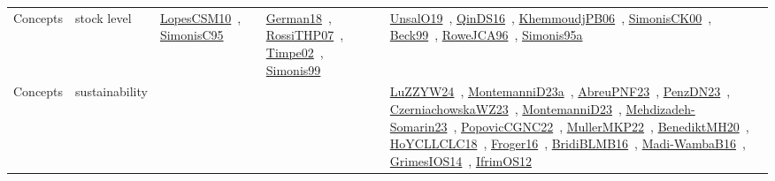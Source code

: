 {\begin{longtable}{lp{3cm}>{\raggedright\arraybackslash}p{6cm}>{\raggedright\arraybackslash}p{6cm}>{\raggedright\arraybackslash}p{8cm}}
Concepts & stock level & \href{../works/LopesCSM10.pdf}{LopesCSM10}~\cite{LopesCSM10}, \href{../works/SimonisC95.pdf}{SimonisC95}~\cite{SimonisC95} & \href{../works/German18.pdf}{German18}~\cite{German18}, \href{../works/RossiTHP07.pdf}{RossiTHP07}~\cite{RossiTHP07}, \href{../works/Timpe02.pdf}{Timpe02}~\cite{Timpe02}, \href{../works/Simonis99.pdf}{Simonis99}~\cite{Simonis99} & \href{../works/UnsalO19.pdf}{UnsalO19}~\cite{UnsalO19}, \href{../works/QinDS16.pdf}{QinDS16}~\cite{QinDS16}, \href{../works/KhemmoudjPB06.pdf}{KhemmoudjPB06}~\cite{KhemmoudjPB06}, \href{../works/SimonisCK00.pdf}{SimonisCK00}~\cite{SimonisCK00}, \href{../works/Beck99.pdf}{Beck99}~\cite{Beck99}, \href{../works/RoweJCA96.pdf}{RoweJCA96}~\cite{RoweJCA96}, \href{../works/Simonis95a.pdf}{Simonis95a}~\cite{Simonis95a}\\
Concepts & sustainability &  &  & \href{../works/LuZZYW24.pdf}{LuZZYW24}~\cite{LuZZYW24}, \href{../works/MontemanniD23a.pdf}{MontemanniD23a}~\cite{MontemanniD23a}, \href{../works/AbreuPNF23.pdf}{AbreuPNF23}~\cite{AbreuPNF23}, \href{../works/PenzDN23.pdf}{PenzDN23}~\cite{PenzDN23}, \href{../works/CzerniachowskaWZ23.pdf}{CzerniachowskaWZ23}~\cite{CzerniachowskaWZ23}, \href{../works/MontemanniD23.pdf}{MontemanniD23}~\cite{MontemanniD23}, \href{../works/Mehdizadeh-Somarin23.pdf}{Mehdizadeh-Somarin23}~\cite{Mehdizadeh-Somarin23}, \href{../works/PopovicCGNC22.pdf}{PopovicCGNC22}~\cite{PopovicCGNC22}, \href{../works/MullerMKP22.pdf}{MullerMKP22}~\cite{MullerMKP22}, \href{../works/BenediktMH20.pdf}{BenediktMH20}~\cite{BenediktMH20}, \href{../works/HoYCLLCLC18.pdf}{HoYCLLCLC18}~\cite{HoYCLLCLC18}, \href{../works/Froger16.pdf}{Froger16}~\cite{Froger16}, \href{../works/BridiBLMB16.pdf}{BridiBLMB16}~\cite{BridiBLMB16}, \href{../works/Madi-WambaB16.pdf}{Madi-WambaB16}~\cite{Madi-WambaB16}, \href{../works/GrimesIOS14.pdf}{GrimesIOS14}~\cite{GrimesIOS14}, \href{../works/IfrimOS12.pdf}{IfrimOS12}~\cite{IfrimOS12}\\

\end{longtable}}
